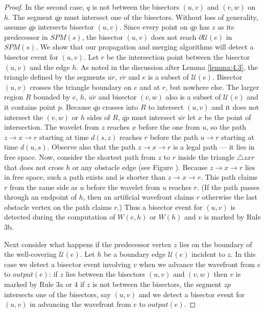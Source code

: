 \begin{proof}
	In the second case, $q$ is not between the bisectors $(u,v)$ and $(v,w)$
	on $h$. The segment $\overline{qp}$ must intersect one of the bisectors.
	Without loss of generality, assume $\overline{qp}$ intersects bisector
	$(u,v)$. Since every point on $\overline{qp}$ has $z$ as its predecessor
	in $SPM(s)$, the bisector $(u,v)$ does not reach $\partial\mathcal{U}(e)$
	in $SPM(s)$. We show that our propagation and merging algorithms will
	detect a bisector event for $(u,v)$. Let $r$ be the intersection point
	between the bisector $(u,v)$ and the edge $h$. As noted in the discussion
	after Lemma \ref{lemma:4.3}, the triangle defined by the segments $\overline{ur}$,
	$\overline{vr}$ and $e$ is a subset of $\mathcal{U}(e)$. Bisector $(u,v)$
	crosses the triangle boundary on $e$ and at $r$, but nowhere else. The
	larger region $R$ bounded by $e$, $h$, $\overline{ur}$ and bisector
	$(v,w)$ also is a subset of $\mathcal{U}(e)$ and it contains point $p$.
	Because $\overline{qp}$ crosses into $R$ to intersect $(u,v)$ and it does
	not intersect the $(v,w)$ or $h$ sides of $R$, $\overline{qp}$ must
	intersect $\overline{ur}$ let $x$ be the point of intersection. The
	wavelet from $z$ reaches $x$ before the one from $u$, so the path $z
	\to x \to r$ starting at time $d(s,z)$ reaches $r$ before the path $u \to
	r$ starting at time $d(u,s)$. Observe also that the path $z \to x \to r$
	is a legal path --- it lies in free space. Now, consider the shortest
	path from $z$ to $r$ inside the triangle $\bigtriangleup zxr$ that does
	not cross $h$ or any obstacle edge (see Figure ). Because $z\to x \to
	r$ lies in free space, such a path exists and is shorter than $z \to x
	\to r$. This path claims $r$ from the same side as $u$ before the wavelet
	from $u$ reaches $r$. (If the path passes through an endpoint of $h$,
	then an artificial wavefront 
	claims $r$ otherwise the last obstacle
	vertex on the path claims $r$.) Thus a bisector event for $(u,v)$ is
	detected during the computation of $W(e,h)$ or $W(h)$ and $v$ is marked
	by Rule 3b.

	Next consider what happens if the predecessor vertex $z$ lies on the
	boundary of the well-covering $\mathcal{U}(e)$. Let $h$ be a boundary
	edge $\mathcal{U}(e)$ incident to $z$. In this case we detect a bisector
	event involving $v$ when we advance the wavefront from $e$ to
	$output(e)$: if $z$ lies between the bisectors $(u,v)$ and $(v,w)$ then
	$v$ is marked by Rule 3a or 4 if $z$ is not between the bisectors, the
	segment $zp$ intersects one of the bisectors, say $(u,v)$ and we detect a
	bisector event for $(u,v)$ in advancing the wavefront from $e$ to
	$output(e)$.


\end{proof}
